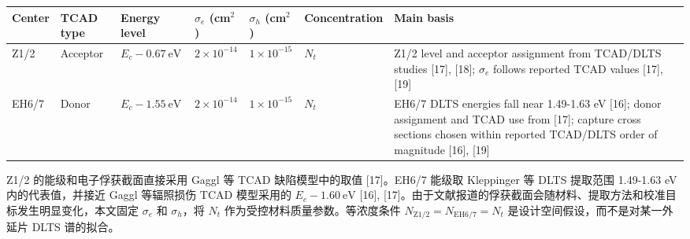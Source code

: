 \documentclass[
  10pt,
  a4paper,
]{ctexart}
\newcounter{none} %
\begin{document}
{\def\LTcaptype{none} %
\begin{longtable}[]{@{}
  >{\raggedright\arraybackslash}p{}
  >{\raggedright\arraybackslash}p{}
  >{\raggedright\arraybackslash}p{}
  >{\raggedleft\arraybackslash}p{}
  >{\raggedleft\arraybackslash}p{}
  >{\raggedleft\arraybackslash}p{}
  >{\raggedright\arraybackslash}p{}@{}}
\toprule\noalign{}
\begin{minipage}[b]{\linewidth}\raggedright
Center
\end{minipage} & \begin{minipage}[b]{\linewidth}\raggedright
TCAD type
\end{minipage} & \begin{minipage}[b]{\linewidth}\raggedright
Energy level
\end{minipage} & \begin{minipage}[b]{\linewidth}\raggedleft
\(\sigma_e\) (cm\(^2\))
\end{minipage} & \begin{minipage}[b]{\linewidth}\raggedleft
\(\sigma_h\) (cm\(^2\))
\end{minipage} & \begin{minipage}[b]{\linewidth}\raggedleft
Concentration
\end{minipage} & \begin{minipage}[b]{\linewidth}\raggedright
Main basis
\end{minipage} \\
\midrule\noalign{}
\endhead
\bottomrule\noalign{}
\endlastfoot
Z1/2 & Acceptor & \(E_c-0.67\ \mathrm{eV}\) & \(2\times10^{-14}\) &
\(1\times10^{-15}\) & \(N_t\) & Z1/2 level and acceptor assignment from
TCAD/DLTS studies {[}17{]}, {[}18{]}; \(\sigma_e\) follows reported TCAD
values {[}17{]}, {[}19{]} \\
EH6/7 & Donor & \(E_c-1.55\ \mathrm{eV}\) & \(2\times10^{-14}\) &
\(1\times10^{-15}\) & \(N_t\) & EH6/7 DLTS energies fall near 1.49-1.63
eV {[}16{]}; donor assignment and TCAD use from {[}17{]}; capture cross
sections chosen within reported TCAD/DLTS order of magnitude {[}16{]},
{[}19{]} \\
\end{longtable}
}

Z1/2 的能级和电子俘获截面直接采用 Gaggl 等 TCAD 缺陷模型中的取值
{[}17{]}。EH6/7 能级取 Kleppinger 等 DLTS 提取范围 1.49-1.63 eV
内的代表值，并接近 Gaggl 等辐照损伤 TCAD 模型采用的
\(E_c-1.60\ \mathrm{eV}\) {[}16{]},
{[}17{]}。由于文献报道的俘获截面会随材料、提取方法和校准目标发生明显变化，本文固定
\(\sigma_e\) 和 \(\sigma_h\)，将 \(N_t\)
作为受控材料质量参数。等浓度条件
\(N_{\mathrm{Z1/2}}=N_{\mathrm{EH6/7}}=N_t\)
是设计空间假设，而不是对某一外延片 DLTS 谱的拟合。
\end{document}
